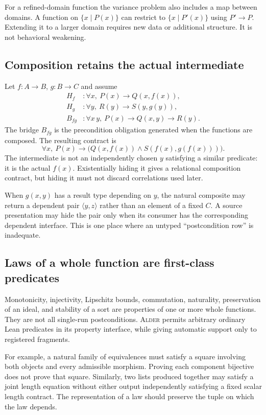 \documentclass[11pt,a4paper]{article}
\newcommand{\Alder}{\textsc{Alder}}
\theoremstyle{plain}
\theoremstyle{definition}
\theoremstyle{remark}
\begin{document}
For a refined-domain function the variance problem also includes a map between domains. A function on $\{x\mid P(x)\}$ can restrict to $\{x\mid P'(x)\}$ using $P'\to P$. Extending it to a larger domain requires new data or additional structure. It is not behavioral weakening.

\subsection{Composition retains the actual intermediate}
Let $f:A\to B$, $g:B\to C$ and assume
\begin{align*}
 H_f&:\forall x,\ P(x)\to Q(x,f(x)),\\
 H_g&:\forall y,\ R(y)\to S(y,g(y)),\\
 B_{fg}&:\forall x\,y,\ P(x)\to Q(x,y)\to R(y).
\end{align*}
The bridge $B_{fg}$ is the precondition obligation generated when the functions are composed. The resulting contract is
\begin{equation}\label{eq:behavior-compose}
 \forall x,\ P(x)\to
 \bigl(Q(x,f(x))\wedge S(f(x),g(f(x)))\bigr).
\end{equation}
The intermediate is not an independently chosen $y$ satisfying a similar predicate: it is the actual $f(x)$. Existentially hiding it gives a relational composition contract, but hiding it must not discard correlations used later.

When $g(x,y)$ has a result type depending on $y$, the natural composite may return a dependent pair $\langle y,z\rangle$ rather than an element of a fixed $C$. A source presentation may hide the pair only when its consumer has the corresponding dependent interface. This is one place where an untyped ``postcondition row'' is inadequate.

\subsection{Laws of a whole function are first-class predicates}
Monotonicity, injectivity, Lipschitz bounds, commutation, naturality, preservation of an ideal, and stability of a sort are properties of one or more whole functions. They are not all single-run postconditions. \Alder{} permits arbitrary ordinary Lean predicates in its property interface, while giving automatic support only to registered fragments.

For example, a natural family of equivalences must satisfy a square involving both objects and every admissible morphism. Proving each component bijective does not prove that square. Similarly, two lists produced together may satisfy a joint length equation without either output independently satisfying a fixed scalar length contract. The representation of a law should preserve the tuple on which the law depends.
\end{document}
